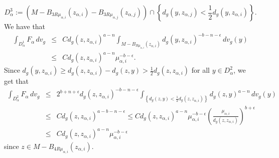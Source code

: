 \documentclass[reqno]{amsart}
\def \eps {\epsilon}
\def \mai {\mu_{\alpha,i}}
\def \maj {\mu_{\alpha,j}}
\def \zai {z_{\alpha,i}}
\def \zaj {z_{\alpha,j}}
\begin{document}
$$D_\alpha^3:=\left(M-B_{3R\mai}(\zai)- B_{3R\maj}(\zaj)\right)\cap \left\{d_g(y,\zaj)<\frac{1}{2}d_g(y,\zai)\right\}.$$
We have that
\begin{eqnarray*} \int_{D_\alpha^1}F_\alpha \, dv_g&\leq &  Cd_g(z,\zai)^{a-n}\int_{M-B_{R\mai}(\zai)}d_g(y,\zai)^{-b-n-\eps}\, dv_g(y)\\
&\leq &Cd_g(z,\zai)^{a-n}\mai^{-b-\eps} .
\end{eqnarray*}
Since $d_g(y,\zai)\geq d_g(z,\zai)- d_g(z,y)>\frac{1}{2}d_g(z,\zai)$ for all $y\in D_\alpha^2$, we get that
\begin{eqnarray*} \int_{D_\alpha^2}F_\alpha \, dv_g&\leq &  2^{b+n+\eps}d_g(z,\zai)^{-b-n-\eps}\int_{\left\{d_g(z,y)<\frac{1}{2}d_g(z,\zai)\right\}}d_g(z,y)^{a-n}\, dv_g(y)\\
&\leq &Cd_g(z,\zai)^{a-b-n-\eps}\leq C d_g(z,\zai)^{a-n}\mai^{-b-\eps} \left(\frac{\mai}{d_g(z,\zai)}\right)^{b+\eps}\\
&\leq &  C d_g(z,\zai)^{a-n}\mai^{-b-\eps}
\end{eqnarray*}
since $z\in M-B_{4R\mai}(\zai)$.
\end{document}
